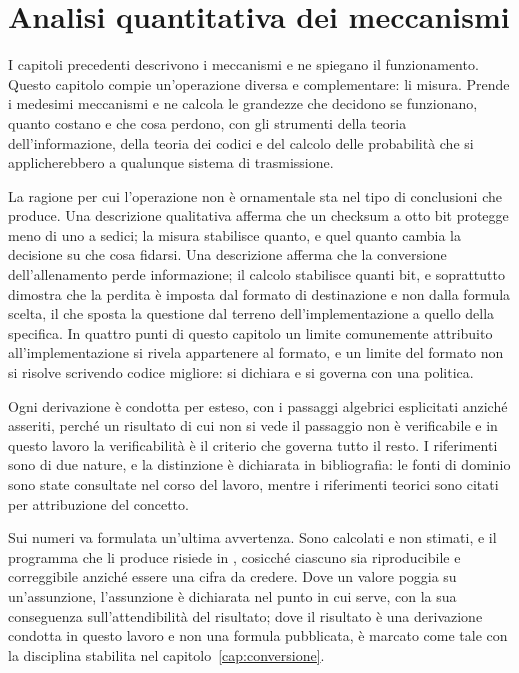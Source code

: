
\chapter{Analisi quantitativa dei meccanismi}
\label{cap:analisi}

I capitoli precedenti descrivono i meccanismi e ne spiegano il funzionamento. Questo capitolo compie un'operazione diversa e complementare: li misura. Prende i medesimi meccanismi e ne calcola le grandezze che decidono se funzionano, quanto costano e che cosa perdono, con gli strumenti della teoria dell'informazione, della teoria dei codici e del calcolo delle probabilità che si applicherebbero a qualunque sistema di trasmissione.

La ragione per cui l'operazione non è ornamentale sta nel tipo di conclusioni che produce. Una descrizione qualitativa afferma che un checksum a otto bit protegge meno di uno a sedici; la misura stabilisce quanto, e quel quanto cambia la decisione su che cosa fidarsi. Una descrizione afferma che la conversione dell'allenamento perde informazione; il calcolo stabilisce quanti bit, e soprattutto dimostra che la perdita è imposta dal formato di destinazione e non dalla formula scelta, il che sposta la questione dal terreno dell'implementazione a quello della specifica. In quattro punti di questo capitolo un limite comunemente attribuito all'implementazione si rivela appartenere al formato, e un limite del formato non si risolve scrivendo codice migliore: si dichiara e si governa con una politica.

Ogni derivazione è condotta per esteso, con i passaggi algebrici esplicitati anziché asseriti, perché un risultato di cui non si vede il passaggio non è verificabile e in questo lavoro la verificabilità è il criterio che governa tutto il resto. I riferimenti sono di due nature, e la distinzione è dichiarata in bibliografia: le fonti di dominio sono state consultate nel corso del lavoro, mentre i riferimenti teorici sono citati per attribuzione del concetto.

Sui numeri va formulata un'ultima avvertenza. Sono calcolati e non stimati, e il programma che li produce risiede in , cosicché ciascuno sia riproducibile e correggibile anziché essere una cifra da credere. Dove un valore poggia su un'assunzione, l'assunzione è dichiarata nel punto in cui serve, con la sua conseguenza sull'attendibilità del risultato; dove il risultato è una derivazione condotta in questo lavoro e non una formula pubblicata, è marcato come tale con la disciplina stabilita nel capitolo~\ref{cap:conversione}.

